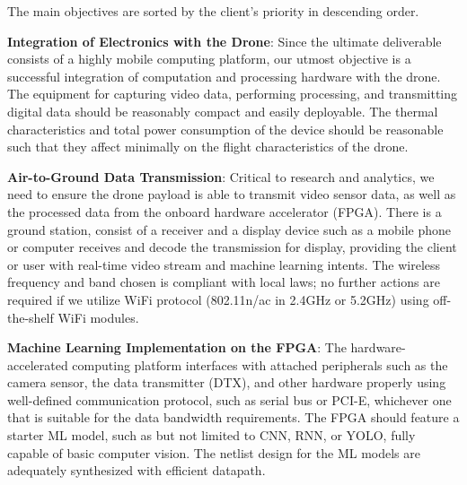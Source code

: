 The main objectives are sorted by the client's priority in descending order.

\textbf{Integration of Electronics with the Drone}:
Since the ultimate deliverable consists of a highly mobile computing platform,
our utmost objective is a successful integration of computation and processing hardware with the drone.
The equipment for capturing video data, performing processing, and transmitting digital data should be reasonably compact and easily deployable.
The thermal characteristics and total power consumption of the device should be reasonable such that they affect minimally
on the flight characteristics of the drone.

\textbf{Air-to-Ground Data Transmission}:
Critical to research and analytics, we need to ensure the drone payload is able to transmit video sensor data, as well as the processed data
from the onboard hardware accelerator (FPGA). There is a ground station, consist of a receiver and a display device such as a mobile phone or 
computer receives and decode the transmission for display, providing the client or user with real-time video stream and machine learning intents.
The wireless frequency and band chosen is compliant with local laws; no further actions are required if we utilize WiFi protocol (802.11n/ac in 2.4GHz or 5.2GHz)
using off-the-shelf WiFi modules.

\textbf{Machine Learning Implementation on the FPGA}:
The hardware-accelerated computing platform interfaces with attached peripherals such as the camera sensor, the data transmitter (DTX), and other hardware properly
using well-defined communication protocol, such as serial bus or PCI-E, whichever one that is suitable for the data bandwidth requirements. 
The FPGA should feature a starter ML model, such as but not limited to CNN, RNN, or YOLO, fully capable of basic computer vision.
The netlist design for the ML models are adequately synthesized with efficient datapath.
